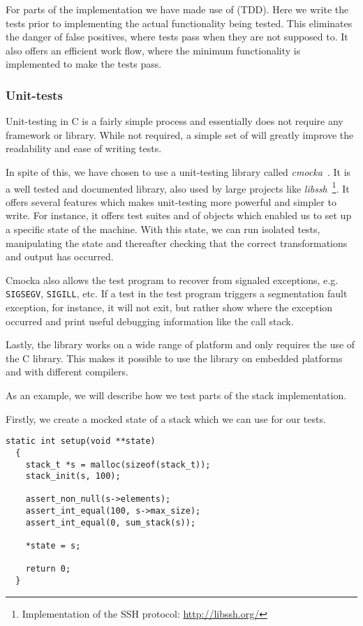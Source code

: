 For parts of the implementation we have made use of  (TDD). Here we write the tests prior to implementing the actual
functionality being tested. This eliminates the danger of false positives, where
tests pass when they are not supposed to. It also offers an efficient work flow,
where the minimum functionality is implemented to make the tests pass.

\subsubsection{Unit-tests}
Unit-testing in C is a fairly simple process and essentially does not require
any framework or library. While not required, a simple set of  will
greatly improve the readability and ease of writing tests.

In spite of this, we have chosen to use a unit-testing library called {\it
  cmocka}~\cite{cmocka}. It is a well tested and documented library, also used
by large projects like {\it libssh}~\footnote{Implementation of the SSH protocol:
  \url{http://libssh.org/}}. It offers several features which makes unit-testing
more powerful and simpler to write. For instance, it offers test suites and
 of objects which enabled us to set up a specific state of the
machine. With this state, we can run isolated tests, manipulating the state and
thereafter checking that the correct transformations and output has occurred.

Cmocka also allows the test program to recover from signaled exceptions,
e.g. {\tt SIGSEGV}, {\tt SIGILL}, etc. If a test in the test program triggers a
segmentation fault exception, for instance, it will not exit, but rather show
where the exception occurred and print useful debugging information like the
call stack.

Lastly, the library works on a wide range of platform and only requires the use
of the C library. This makes it possible to use the library on embedded
platforms and with different compilers.

As an example, we will describe how we test parts of the stack implementation.

Firstly, we create a mocked state of a stack which we can use for our tests.
\begin{lstlisting}[language={[ANSI]C},caption={Unit-test setup procedure}]
  static int setup(void **state)
  {
    stack_t *s = malloc(sizeof(stack_t));
    stack_init(s, 100);

    assert_non_null(s->elements);
    assert_int_equal(100, s->max_size);
    assert_int_equal(0, sum_stack(s));

    *state = s;

    return 0;
  }
\end{lstlisting}

